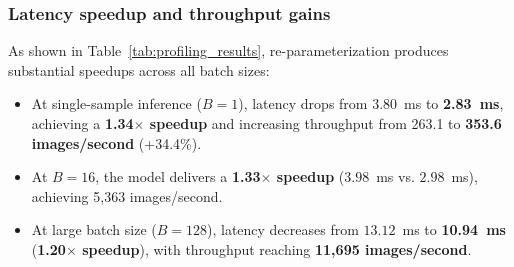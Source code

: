 \begin{table}[htbp]
\centering
\small
{}
\caption{Hardware inference profiling on NVIDIA Tesla T4 (FP32 precision): latency, throughput, and memory comparison between multi-branch training mode and RepTokenMix fused deploy mode across batch sizes. Numerical difference represents the Chebyshev ($\ell_\infty$) norm.}
\label{tab:profiling_results}
\end{table}

\subsubsection{Latency speedup and throughput gains}
As shown in Table~\ref{tab:profiling_results}, re-parameterization produces substantial speedups across all batch sizes:
\begin{itemize}
    \item At single-sample inference ($B = 1$), latency drops from $3.80$~ms to \textbf{2.83~ms}, achieving a \textbf{1.34$\times$ speedup} and increasing throughput from 263.1 to \textbf{353.6 images/second} (+34.4\%).
    \item At $B = 16$, the model delivers a \textbf{1.33$\times$ speedup} ($3.98$~ms vs. $2.98$~ms), achieving 5,363 images/second.
    \item At large batch size ($B = 128$), latency decreases from $13.12$~ms to \textbf{10.94~ms} (\textbf{1.20$\times$ speedup}), with throughput reaching \textbf{11,695 images/second}.
\end{itemize}

